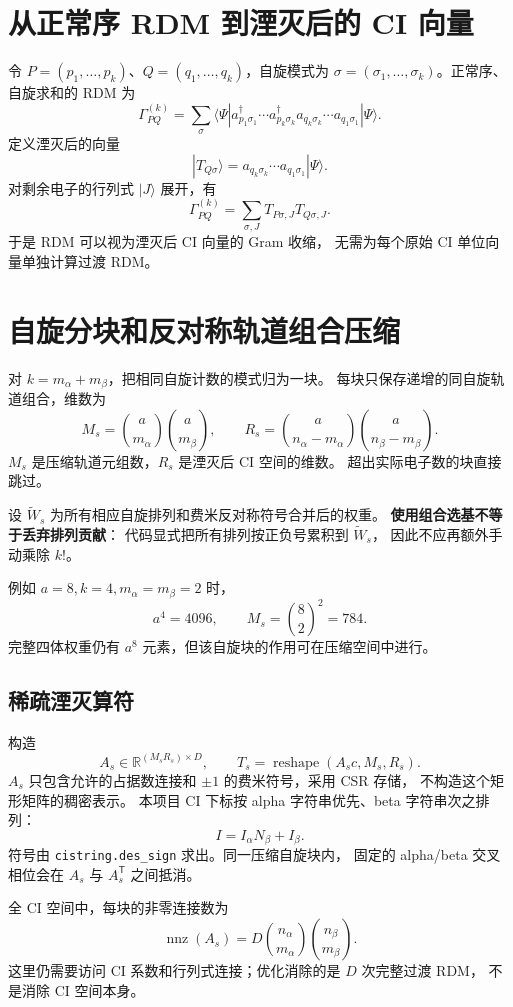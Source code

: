 \documentclass[UTF8,a4paper,11pt,fontset=fandol]{ctexart}
\newcommand{\T}{\mathsf{T}}
\begin{document}
\section{从正常序 RDM 到湮灭后的 CI 向量}
令 $P=(p_1,\ldots,p_k)$、$Q=(q_1,\ldots,q_k)$，自旋模式为
$\sigma=(\sigma_1,\ldots,\sigma_k)$。正常序、自旋求和的 RDM 为
\[
 \Gamma^{(k)}_{PQ}
 =\sum_\sigma
 \langle\Psi|
 a^\dagger_{p_1\sigma_1}\cdots a^\dagger_{p_k\sigma_k}
 a_{q_k\sigma_k}\cdots a_{q_1\sigma_1}
 |\Psi\rangle.
\]
定义湮灭后的向量
\[
 |T_{Q\sigma}\rangle
 =a_{q_k\sigma_k}\cdots a_{q_1\sigma_1}|\Psi\rangle.
\]
对剩余电子的行列式 $|J\rangle$ 展开，有
\[
 \Gamma^{(k)}_{PQ}
 =\sum_{\sigma,J}T_{P\sigma,J}T_{Q\sigma,J}.
\]
于是 RDM 可以视为湮灭后 CI 向量的 Gram 收缩，
无需为每个原始 CI 单位向量单独计算过渡 RDM。

\section{自旋分块和反对称轨道组合压缩}
对 $k=m_\alpha+m_\beta$，把相同自旋计数的模式归为一块。
每块只保存递增的同自旋轨道组合，维数为
\[
 M_s=\binom{a}{m_\alpha}\binom{a}{m_\beta},\qquad
 R_s=\binom{a}{n_\alpha-m_\alpha}
     \binom{a}{n_\beta-m_\beta}.
\]
$M_s$ 是压缩轨道元组数，$R_s$ 是湮灭后 CI 空间的维数。
超出实际电子数的块直接跳过。

设 $\widetilde W_s$ 为所有相应自旋排列和费米反对称符号合并后的权重。
\textbf{使用组合选基不等于丢弃排列贡献}：
代码显式把所有排列按正负号累积到 $\widetilde W_s$，
因此不应再额外手动乘除 $k!$。

例如 $a=8,k=4,m_\alpha=m_\beta=2$ 时，
\[
 a^4=4096,\qquad M_s=\binom82^2=784.
\]
完整四体权重仍有 $a^8$ 元素，但该自旋块的作用可在压缩空间中进行。

\subsection{稀疏湮灭算符}
构造
\[
 A_s\in\mathbb R^{(M_sR_s)\times D},\qquad
 T_s=\operatorname{reshape}(A_s c,M_s,R_s).
\]
$A_s$ 只包含允许的占据数连接和 $\pm1$ 的费米符号，采用 CSR 存储，
不构造这个矩形矩阵的稠密表示。
本项目 CI 下标按 alpha 字符串优先、beta 字符串次之排列：
\[
 I=I_\alpha N_\beta+I_\beta.
\]
符号由 \texttt{cistring.des\_sign} 求出。同一压缩自旋块内，
固定的 alpha/beta 交叉相位会在 $A_s$ 与 $A_s^\T$ 之间抵消。

全 CI 空间中，每块的非零连接数为
\[
 \operatorname{nnz}(A_s)
 =D\binom{n_\alpha}{m_\alpha}\binom{n_\beta}{m_\beta}.
\]
这里仍需要访问 CI 系数和行列式连接；优化消除的是 $D$ 次完整过渡 RDM，
不是消除 CI 空间本身。
\end{document}

